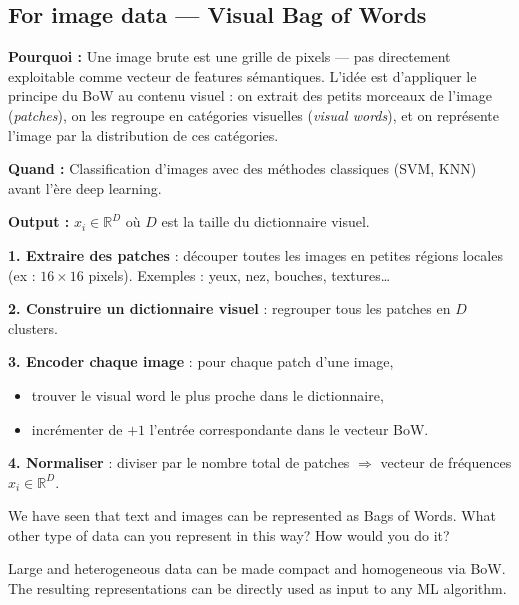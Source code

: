 \documentclass[11pt,a4paper,openany]{book}
\begin{document}
\subsection{For image data — Visual Bag of Words}

\begin{rembox}[title=Pourquoi et quand utiliser le Visual BoW ?]
\textbf{Pourquoi :} Une image brute est une grille de pixels — pas directement exploitable comme vecteur de features sémantiques. L'idée est d'appliquer le principe du BoW au contenu visuel : on extrait des petits morceaux de l'image (\textit{patches}), on les regroupe en catégories visuelles (\textit{visual words}), et on représente l'image par la distribution de ces catégories.

\textbf{Quand :} Classification d'images avec des méthodes classiques (SVM, KNN) avant l'ère deep learning.

\textbf{Output :} $x_i \in \mathbb{R}^D$ où $D$ est la taille du dictionnaire visuel.
\end{rembox}

\begin{algbox}[title=Visual Bag of Words — procédure]
\textbf{1. Extraire des patches} : découper toutes les images en petites régions locales (ex : $16\times16$ pixels). Exemples : yeux, nez, bouches, textures\dots

\textbf{2. Construire un dictionnaire visuel} : regrouper tous les patches en $D$ clusters.

\textbf{3. Encoder chaque image} : pour chaque patch d'une image,
\begin{itemize}
    \item trouver le visual word le plus proche dans le dictionnaire,
    \item incrémenter de $+1$ l'entrée correspondante dans le vecteur BoW.
\end{itemize}

\textbf{4. Normaliser} : diviser par le nombre total de patches $\Rightarrow$ vecteur de fréquences $x_i \in \mathbb{R}^D$.
\end{algbox}

\begin{rembox}[title=Discussion]
We have seen that text and images can be represented as Bags of Words. What other type of data can you represent in this way? How would you do it?

\medskip
Large and heterogeneous data can be made compact and homogeneous via BoW. The resulting representations can be directly used as input to any ML algorithm.
\end{rembox}
\end{document}
